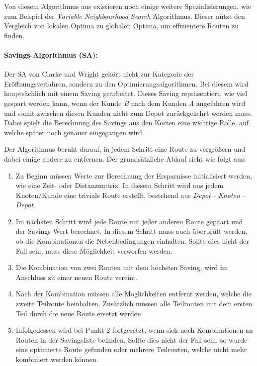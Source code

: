 \noindent
Von diesem Algorithmus aus existieren noch einige weitere Spezialisierungen, wie zum Beispiel der \textit{Variable Neighbourhood Search} Algorithmus.
Dieser nützt den Vergleich von lokalen Optima zu globalen Optima, um effizientere Routen zu finden. 

\paragraph{Savings-Algorithmus (SA):} 
\label{savingKurz}

Der SA von Clarke und Wright gehört nicht zur Kategorie der Eröffnungsverfahren, sondern zu den Optimierungsalgorithmen. 
Bei diesem wird hauptsächlich mit einem Saving gearbeitet. 
Dieses Saving repräsentiert, wie viel gespart werden kann, wenn der Kunde \textit{B} nach dem Kunden \textit{A} angefahren wird und somit zwischen diesen Kunden nicht zum Depot zurückgekehrt werden muss. 
Dabei spielt die Berechnung des Savings aus den Kosten eine wichtige Rolle, auf welche später noch genauer eingegangen wird. 

\noindent
Der Algorithmus beruht darauf, in jedem Schritt eine Route zu vergrößern und dabei einige andere zu entfernen. 
Der grundsätzliche Ablauf sieht wie folgt aus:
\begin{enumerate}
	\item Zu Beginn müssen Werte zur Berechnung der Ersparnisse initialisiert werden, wie eine Zeit- oder Distanzmatrix. 
	In diesem Schritt wird aus jedem Knoten/Kunde eine triviale Route erstellt, bestehend aus \textit{Depot - Knoten - Depot}.
	\item Im nächsten Schritt wird jede Route mit jeder anderen Route gepaart und der Savings-Wert berechnet. 
	In diesem Schritt muss auch überprüft werden, ob die Kombinationen die Nebenbedingungen einhalten. 
	Sollte dies nicht der Fall sein, muss diese Möglichkeit verworfen werden. 
	\item Die Kombination von zwei Routen mit dem höchsten Saving, wird im Anschluss zu einer neuen Route vereint. 
	\item Nach der Kombination müssen alle Möglichkeiten entfernt werden, welche die zweite Teilroute beinhalten. 
	Zusätzlich müssen alle Teilrouten mit dem ersten Teil durch die neue Route ersetzt werden. 
	\item Infolgedessen wird bei Punkt 2 fortgesetzt, wenn sich noch Kombinationen an Routen in der Savingsliste befinden. 
	Sollte dies nicht der Fall sein, so wurde eine optimierte Route gefunden oder mehrere Teilrouten, welche nicht mehr kombiniert werden können. 
\end{enumerate}


